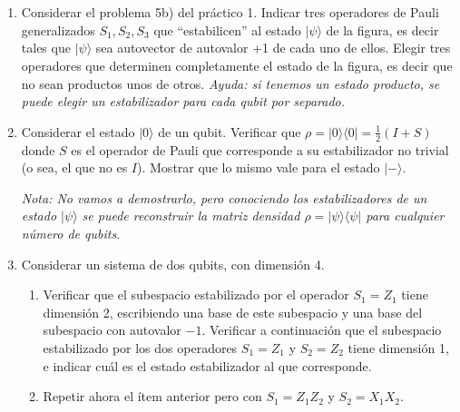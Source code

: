 \documentclass[a4paper,11pt,spanish]{article}
\newcommand{\ket}[1]{|#1\rangle}
\newcommand{\bra}[1]{\langle #1|}
\newcommand{\ketbra}[2]{\ket{#1}\bra{#2}}
\newcommand{\proj}[1]{\ketbra {#1}{#1}}
\begin{document}
\author{C. Cormick}


\\

\\

\vspace{10pt}

\begin{enumerate}
\item Considerar el problema 5b) del práctico 1. Indicar tres operadores de Pauli generalizados $S_1, S_2, S_3$ que ``estabilicen'' al estado $\ket{\psi}$ de la figura, es decir tales que $\ket{\psi}$ sea autovector de autovalor +1 de cada uno de ellos. Elegir tres operadores que determinen completamente el estado de la figura, es decir que no sean productos unos de otros. {\it Ayuda: si tenemos un estado producto, se puede elegir un estabilizador para cada qubit por separado.}
 \medskip

 \item Considerar el estado $\ket{0}$ de un qubit. Verificar que $\rho=\ketbra{0}{0}=\frac{1}{2}(I+S)$ donde $S$ es el operador de Pauli que corresponde a su estabilizador no trivial (o sea, el que no es $I$). Mostrar que lo mismo vale para el estado $\ket{-}$.

 {\it Nota: No vamos a demostrarlo, pero conociendo los estabilizadores de un estado $\ket{\psi}$ se puede reconstruir la matriz densidad $\rho=\proj{\psi}$ para cualquier número de qubits.}

 \medskip

 \item Considerar un sistema de dos qubits, con dimensi\'on 4.
 \begin{enumerate}
 \item Verificar que el subespacio estabilizado por el operador $S_1=Z_1$ tiene dimensi\'on 2, escribiendo una base de este subespacio y una base del subespacio con autovalor $-1$. Verificar a continuaci\'on que el subespacio estabilizado por los dos operadores $S_1=Z_1$ y $S_2=Z_2$ tiene dimensi\'on 1, e indicar cu\'al es el estado estabilizador al que corresponde.
 \item Repetir ahora el \'item anterior pero con $S_1=Z_1Z_2$ y $S_2=X_1X_2$.
 \end{enumerate}
 \medskip


\end{enumerate}
\end{document}
